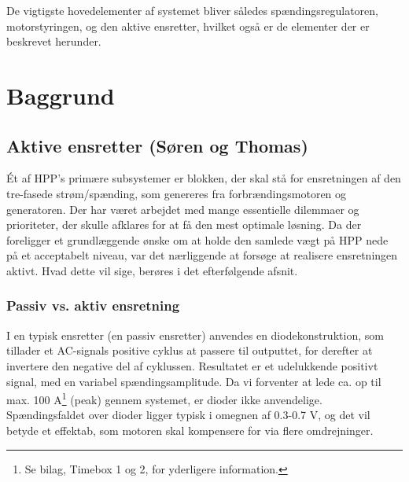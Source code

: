 De vigtigste hovedelementer af systemet bliver således spændingsregulatoren, motorstyringen, og den aktive ensretter, hvilket også er de elementer der er beskrevet herunder.

\chapter{Baggrund}
\label{sec:baggrund}

\section{Aktive ensretter (Søren og Thomas)}
\label{sec:aktive-ensretter}

Ét af HPP’s primære subsystemer er blokken, der skal stå for ensretningen af den tre-fasede strøm/spænding, som genereres fra forbrændingsmotoren og generatoren. Der har været arbejdet med  mange essentielle dilemmaer og prioriteter, der skulle afklares for at få den mest optimale løsning. Da der foreligger et grundlæggende ønske om at holde den samlede vægt på HPP nede på et acceptabelt niveau, var det nærliggende at forsøge at realisere ensretningen aktivt. Hvad dette vil sige, berøres i det efterfølgende afsnit.

\subsection{Passiv vs. aktiv ensretning}
\label{sec:passiv-vs.-aktiv}

I en typisk ensretter (en passiv ensretter) anvendes en diodekonstruktion, som tillader et AC-signals positive cyklus at passere til outputtet, for derefter at invertere den negative del af cyklussen. Resultatet er et udelukkende positivt signal, med en variabel spændingsamplitude. Da vi forventer at lede ca. op til max. 100 A\footnote{Se bilag, Timebox 1 og 2, for yderligere information.} (peak) gennem systemet, er dioder ikke anvendelige. Spændingsfaldet over dioder ligger typisk i omegnen af 0.3-0.7 V, og det vil betyde et effektab, som motoren skal kompensere for via flere omdrejninger.

